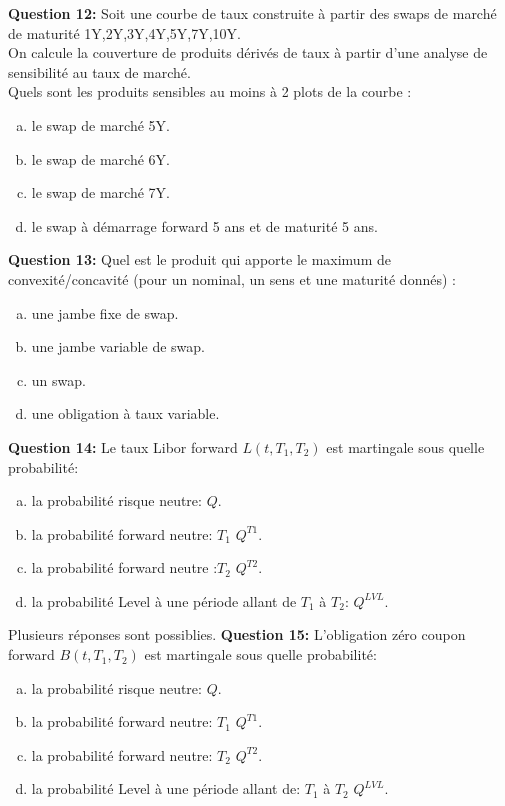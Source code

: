 \documentclass{article}
\newcommand{\indentitem}{\setlength\itemindent{25pt}}
\begin{document}
\textbf{Question 12:}
Soit une courbe de taux construite à partir des swaps de marché de maturité 1Y,2Y,3Y,4Y,5Y,7Y,10Y.\\
On calcule la couverture de produits dérivés de taux à partir d’une analyse de sensibilité au taux de marché.\\
Quels sont les produits sensibles au moins à 2 plots de la courbe :
\begin{enumerate}[a)]
\indentitem \item le swap de marché 5Y.
\indentitem \item le swap de marché 6Y.
\indentitem \item le swap de marché 7Y.
\indentitem \item le swap à démarrage forward 5 ans et de maturité 5 ans.
\end{enumerate}
\textbf{Question 13:}
Quel est le produit qui apporte le maximum de convexité/concavité (pour un nominal, un sens et une maturité donnés) : 
\begin{enumerate}[a)]
\indentitem \item une jambe fixe de swap.
\indentitem \item une jambe variable de swap.
\indentitem \item un swap.
\indentitem \item une obligation à taux variable.
\end{enumerate}
\textbf{Question 14:}
Le taux Libor forward $L(t,T_1,T_2)$ est martingale sous quelle probabilité:
\begin{enumerate}[a)]
\indentitem \item la probabilité risque neutre: $Q$.
\indentitem \item la probabilité forward neutre: $T_1$ $Q^{T1}$.
\indentitem \item la probabilité forward neutre :$T_2$ $Q^{T2}$.
\indentitem \item la probabilité Level à une période allant de $T_1$ à $T_2$: $Q^{LVL}$.
\end{enumerate}
Plusieurs réponses sont possiblies.
\textbf{Question 15:}
L’obligation zéro coupon forward $B(t,T_1, T_2)$ est martingale sous quelle probabilité:
\begin{enumerate}[a)]
\indentitem \item la probabilité risque neutre: $Q$.
\indentitem \item la probabilité forward neutre: $T_1$ $Q^{T1}$.
\indentitem \item la probabilité forward neutre: $T_2$ $Q^{T2}$.
\indentitem \item la probabilité Level à une période allant de: $T_1$ à $T_2$ $Q^{LVL}$.
\end{enumerate}
\end{document}
